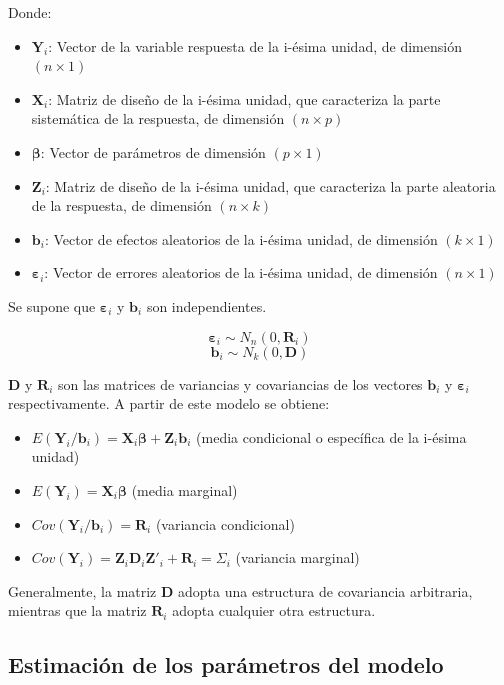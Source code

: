 \documentclass[spanish]{article}
\numberwithin{figure}{subsection}
\numberwithin{equation}{subsection}
\numberwithin{table}{subsection}
\begin{document}
Donde:

\begin{itemize}
	\item $\bm{Y}_i$: Vector de la variable respuesta de la i-ésima unidad, de
	dimensión $(n \times 1)$
	\item $\bm{X}_i$: Matriz de diseño de la i-ésima unidad, que caracteriza la
	parte sistemática de la respuesta, de dimensión $(n \times p)$
	\item $\bm{\beta}$: Vector de parámetros de dimensión $(p \times 1)$
	\item $\bm{Z}_i$: Matriz de diseño de la i-ésima unidad, que caracteriza la
	parte aleatoria de la respuesta, de dimensión $(n \times k)$
	\item $\bm{b}_i$: Vector de efectos aleatorios de la i-ésima unidad, de
	dimensión $(k \times 1)$
	\item $\bm{\varepsilon}_i$: Vector de errores aleatorios de la i-ésima unidad,
	de dimensión $(n \times 1)$
\end{itemize}

Se supone que $\bm{\varepsilon}_i$ y $\bm{b}_i$ son independientes.

\[ \bm{\varepsilon}_i \sim N_{n}(0, \bm{R}_i) \]
\[ \bm{b}_i \sim N_k(0, \bm{D}) \]

$\bm{D}$ y $\bm{R}_i$ son las matrices de variancias y covariancias de los
vectores $\bm{b}_i$ y $\bm{\varepsilon}_i$ respectivamente. A partir de este
modelo se obtiene:

\begin{itemize}
	\item $E(\bm{Y}_i/\bm{b}_i) = \bm{X}_i\bm{\beta} + \bm{Z}_i\bm{b}_i$ (media condicional o específica de
	la i-ésima unidad)
	\item $E(\bm{Y}_i) = \bm{X}_i\bm{\beta}$ (media marginal)
	\item $Cov(\bm{Y}_i/\bm{b}_i) = \bm{R}_i$ (variancia condicional)
	\item $Cov(\bm{Y}_i) = \bm{Z}_i \bm{D}_i \bm{Z}'_i + \bm{R}_i = \bm{\varSigma}_i$ (variancia marginal)
\end{itemize}

Generalmente, la matriz $\bm{D}$ adopta una estructura de covariancia arbitraria,
mientras que la matriz $\bm{R}_i$ adopta cualquier otra estructura.

\subsection{Estimación de los parámetros del modelo}
\end{document}
